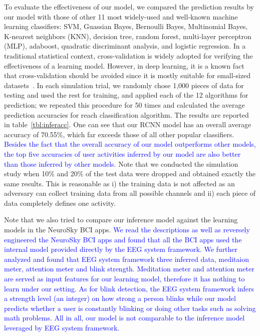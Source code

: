 \indent To evaluate the effectiveness of our model, we compared the prediction results by our model with those of other 11 most widely-used and well-known machine learning classifiers: SVM, Guassian Bayes, Bernoulli Bayes, Multinomial Bayes, K-nearest neighbors (KNN), decision tree, random forest, multi-layer perceptron (MLP), adaboost, quadratic discriminant analysis, and logistic regression. In a traditional statistical context, cross-validation is widely adopted for verifying the effectiveness of a learning model. However, in deep learning, it is a known fact that cross-validation should be avoided  since it is mostly suitable for small-sized datasets~\cite{deepcrossvalid}. In each simulation trial, we randomly chose 1,000 pieces of data for testing and used the rest for training, and applied each of the 12 algorithms for prediction; we repeated this procedure for 50 times and calculated the average prediction accuracies for reach classification algorithm. The results are reported in table~\ref{tbl:inferacc}. One can see that our RCNN model has an overall average accuracy of 70.55\%, which far exceeds those of all other popular classifiers. \textcolor{blue}{Besides the fact that the overall accuracy of our model outperforms other models, the top five accuracies of user activities inferred by our model are also better than those inferred by other models.} Note that we conducted the simulation study when 10\% and 20\% of the test data were dropped and obtained exactly the same results. This is reasonable as i) the training data is not affected as an adversary can collect training data from all possible channels and ii) each piece of data completely defines one activity.

\indent Note that we also tried to compare our inference model against the learning models in the NeuroSky BCI apps. \textcolor{blue}{We read the descriptions as well as reversely engineered the NeuroSky BCI apps and found that all the BCI apps used the internal model provided directly by the EEG system framework. We further analyzed and found that EEG system framework three inferred data, meditaion meter, attention meter and blink strength. Meditation meter and attention meter are served as input features for our learning model, therefore it has nothing to learn under our setting. As for blink detection, the EEG system framework infers a strength level (an integer) on how strong a person blinks while our model predicts whether a user is constantly blinking or doing other tasks such as solving math problems. All in all, our model is not comparable to the inference model leveraged by EEG system  framework.}

